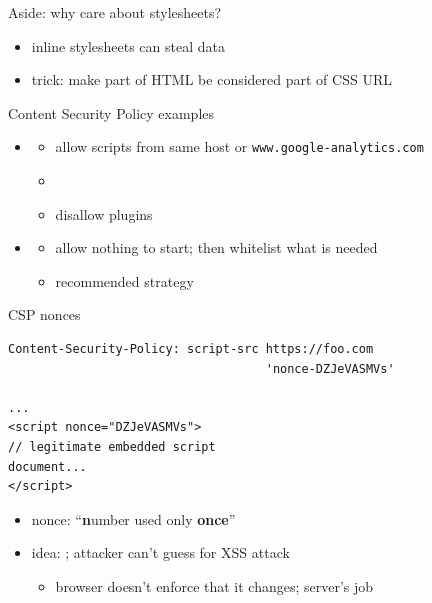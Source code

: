 \begin{frame}{Aside: why care about stylesheets?}
    \begin{itemize}
    \item inline stylesheets can steal data
    \item trick: make part of HTML be considered part of CSS URL
    \end{itemize}
\end{frame}
\begin{frame}{Content Security Policy examples}
    \begin{itemize}
        \item {}
        \begin{itemize}
            \item allow scripts from same host or \texttt{www.google-analytics.com}
            \item {}
            \item disallow plugins
        \end{itemize}
    \item {}
        \begin{itemize}
            \item allow nothing to start; then whitelist what is needed
            \item recommended strategy
        \end{itemize}
    \end{itemize}
\end{frame}

\begin{frame}[fragile,label=CSPNonces]{CSP nonces}
\begin{verbatim}
Content-Security-Policy: script-src https://foo.com
                                    'nonce-DZJeVASMVs'

...
<script nonce="DZJeVASMVs">
// legitimate embedded script
document...
</script>
\end{verbatim}
    \begin{itemize}
    \item nonce: ``\textbf{n}umber used only \textbf{once}''
    \item idea: ; attacker can't guess for XSS attack
        \begin{itemize}
        \item browser doesn't enforce that it changes; server's job
        \end{itemize}
    \end{itemize}
\end{frame}
